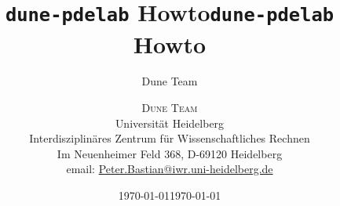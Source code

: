 {
  \title{\texttt{dune-pdelab} Howto}
  \author{Dune Team}
  \date{\today}
}
{
  \title{\texttt{dune-pdelab} Howto}
  \author{\textsc{Dune Team}\\
    Universität Heidelberg\\
    Interdisziplinäres Zentrum für Wissenschaftliches Rechnen\\
    Im Neuenheimer Feld 368, D-69120 Heidelberg\\
	email: \url{Peter.Bastian@iwr.uni-heidelberg.de}
  }
  \date{\today}
  \publishers{%
  \vspace{10mm}
\texttt{[image: ./EPS/example01a\_Q1]} $\hspace{1mm}$
\texttt{[image: ./EPS/example01a\_Q2]} $\hspace{1mm}$
\texttt{[image: ./EPS/example01a\_RT]}
  \\
  \vspace{10mm}
  \url{http://www.dune-project.org/}\\[4em]
{\footnotesize
This work is licensed under the Creative Commons Attribution-ShareAlike 3.0 Unported License. To view a copy of this license, visit \url{http://creativecommons.org/licenses/by-sa/3.0/}.
}
\vspace*{-3em}
  }
}

{

\newsavebox{\logobox}

}

